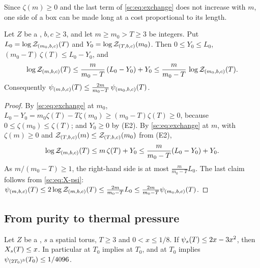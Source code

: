 Since $\zeta(m)\ge0$ and the last term of \eqref{sc:eq:exchange} does not increase with $m$, one side of a box can be made long at a cost proportional to its length.

\begin{lemma}[elongation]\label{sc:lem:elongation}
Let $Z$ be a \PSTS{}, $b,c\ge3$, and let $m\ge m_0>T\ge3$ be integers. Put $L_0=\log\mathcal Z_{(m_0,b,c)}(T)$ and $Y_0=\log\mathcal Z_{(T,b,c)}(m_0)$. Then $0\le Y_0\le L_0$, $(m_0-T)\,\zeta(T)\le L_0-Y_0$, and
\begin{equation}\label{sc:eq:elongation}
\log\mathcal Z_{(m,b,c)}(T)\le\frac{m}{m_0-T}\,(L_0-Y_0)+Y_0\le\frac{m}{m_0-T}\,\log\mathcal Z_{(m_0,b,c)}(T).
\end{equation}
Consequently $\psi_{(m,b,c)}(T)\le\frac{2m}{m_0-T}\,\psi_{(m_0,b,c)}(T)$.
\end{lemma}

\begin{proof}
By \eqref{sc:eq:exchange} at $m_0$, $L_0-Y_0=m_0\zeta(T)-T\zeta(m_0)\ge(m_0-T)\zeta(T)\ge0$, because $0\le\zeta(m_0)\le\zeta(T)$; and $Y_0\ge0$ by (E2). By \eqref{sc:eq:exchange} at $m$, with $\zeta(m)\ge0$ and $\mathcal Z_{(T,b,c)}(m)\le\mathcal Z_{(T,b,c)}(m_0)$ from (E2),
\[
\log\mathcal Z_{(m,b,c)}(T)\le m\,\zeta(T)+Y_0\le\frac{m}{m_0-T}(L_0-Y_0)+Y_0 .
\]
As $m/(m_0-T)\ge1$, the right-hand side is at most $\frac{m}{m_0-T}L_0$. The last claim follows from \eqref{sc:eq:X-psi}: $\psi_{(m,b,c)}(T)\le2\log\mathcal Z_{(m,b,c)}(T)\le\frac{2m}{m_0-T}L_0\le\frac{2m}{m_0-T}\psi_{(m_0,b,c)}(T)$.
\end{proof}


\subsection{From purity to thermal pressure}
\begin{lemma}\label{sc:lem:purity-conversion}
Let $Z$ be a \PSTS{}, $s$ a spatial torus, $T\ge3$ and $0<x\le1/8$. If $\psi_{s}(T)\le2x-3x^2$, then $X_{s}(T)\le x$. In particular \Mcirc{} at $T_0$ implies \Bcirc{} at $T_0$, and \Bcirc{} at $T_0$ implies $\psi_{(2T_0)^3}(T_0)\le1/4096$.
\end{lemma}

